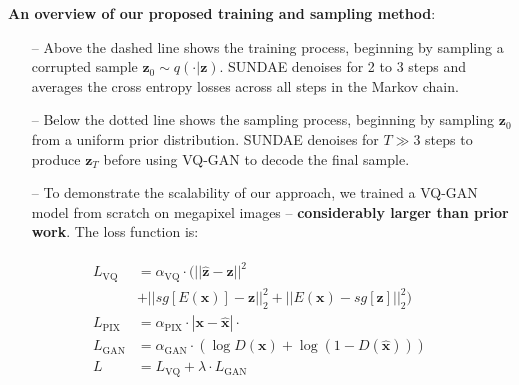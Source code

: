 \documentclass[14pt,margin=0.5in,innermargin=0in,blockverticalspace=-0.1in,colspace=-1.2cm]{tikzposter}
\begin{document}
\begin{columns}
{\begin{tcolorbox}[boxsep=0pt,top=0cm,bottom=0.0cm,adjusted title={\huge\bf Proposed Method},colbacktitle=colorOne]
        {
            \Large
            \textbf{An overview of our proposed training and sampling method}:
            \begin{itemize}
                \item[--] Above the dashed line shows the training process,
                    beginning by sampling a corrupted sample $\mathbf{z}_0 \sim
                    q( \cdot \vert \mathbf{z})$. SUNDAE denoises for 2 to 3
                    steps and averages the cross entropy losses across all steps in the
                    Markov chain.
                \item[--] Below the dotted line shows the sampling process,
                    beginning by sampling $\mathbf{z}_0$ from a uniform prior
                    distribution. SUNDAE denoises for $T \gg 3$ steps to produce
                    $\mathbf{z}_T$ before using VQ-GAN to decode the final
                    sample.
                \item[--] To demonstrate the scalability of our approach, we
                    trained a VQ-GAN model from scratch on megapixel images -- 
                    \textbf{considerably larger than prior work}. The loss function is:
            \end{itemize}
        }
            {
                \large
                \centering
        \begin{minipage}{0.49\linewidth}
            \begin{align*}
            \begin{split}
                L_\text{VQ} &= \alpha_\text{VQ} \cdot (||\hat{\mathbf{z}} -
                \mathbf{z}||^2 \\
                            &+ ||sg[E(\mathbf{x})] - \mathbf{z}||^2_2 +
                ||E(\mathbf{x}) - sg[\mathbf{z}]||^2_2)\\
                L_\text{PIX} &= \alpha_\text{PIX} \cdot |\mathbf{x} -
                \hat{\mathbf{x}}| \cdot \\
                L_\text{GAN} &= \alpha_\text{GAN} \cdot \left(\log D(\mathbf{x}) + \log
                (1-D(\hat{\mathbf{x}}))\right) \\
                L &= L_\text{VQ} + \lambda \cdot L_\text{GAN}
            \end{split}
            \end{align*}
        \end{minipage}
        \hfill
        \begin{minipage}{0.49\linewidth}
            \begin{align*}

\end{align*}
\end{minipage}}
\end{tcolorbox}}
\end{columns}
\end{document}
